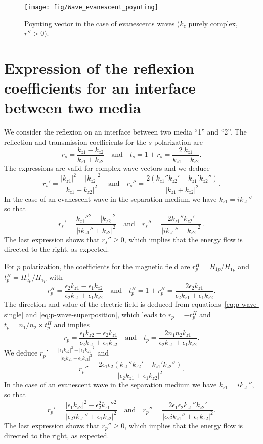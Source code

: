 \begin{figure}[!h]
\texttt{[image: fig/Wave\_evanescent\_poynting]}
\caption{\label{fig:Wave_evanescent_poynting}Poynting vector in the case of evanescents waves ($k_z$ purely complex, $r''>0$).}
\end{figure}

\section{Expression of the reflexion coefficients for an interface between two media}

We consider the reflexion on an interface between two media ``1'' and ``2''.
The reflection and transmission coefficients for the $s$ polarization are\cite{Wikipedia_Fresnel}
$$
r_s = \frac{k_{z1}-k_{z2}}{k_{z1}+k_{z2}} 
\quad\textrm{and}\quad
t_s = 1 + r_s = \frac{2\ k_{z1}}{k_{z1}+k_{z2}}.
$$
The expressions are valid for complex wave vectors and we deduce
$$
r_s' = \frac{|k_{z1}|^2 - |k_{z2}|^2}{|k_{z1} + k_{z2}|^2}
\quad\textrm{and}\quad
r_s'' = \frac{2 (k_{z1}'' k_{z2}' - k_{z1}' k_{z2}'')}{|k_{z1} + k_{z2}|^2}.
$$
In the case of an evanescent wave in the separation medium we have $k_{z1} = i k_{z1}''$ so that
$$
r_s' = \frac{k_{z1}''^2 - |k_{z2}|^2}{|ik_{z1}'' + k_{z2}|^2}
\quad\textrm{and}\quad
r_s'' = \frac{2 k_{z1}'' k_{z2}'}{|ik_{z1}'' + k_{z2}|^2}
\ .
$$
The last expression shows that $r_s'' \ge 0$, which implies that the energy flow is directed to the right, as expected.

For $p$ polarization, the coefficients for the magnetic field are
$r^H_p = H^-_{1p} / H^+_{1p}$ and $t^H_p = H^+_{2p} / H^+_{1p}$ with
$$
r^H_p=\frac{\epsilon_2k_{z1}-\epsilon_1k_{z2}}{\epsilon_2k_{z1}+\epsilon_1k_{z2}}
\quad\textrm{and}\quad
t^H_p = 1+r^H_p = \frac{2\epsilon_2 k_{z1}}{\epsilon_2k_{z1}+\epsilon_1k_{z2}}
.
$$
The direction and value of the electric field is deduced from equations~\ref{eq:p-wave-single} and \ref{eq:p-wave-superposition}, which leads to $r_p=-r^H_p$ and $t_p = n_1/n_2 \times t^H_p$ and implies \cite{Wikipedia_Fresnel}
$$
r_p=
\frac{\epsilon_1k_{z2} - \epsilon_2k_{z1}}{\epsilon_2k_{z1}+\epsilon_1k_{z2}}
\quad\textrm{and}\quad 
t_p = 
\frac{2 n_1 n_2 k_{z1}}{\epsilon_2k_{z1}+\epsilon_1k_{z2}}.
$$
We deduce
$ \displaystyle
r_p' = \frac{|\epsilon_1 k_{z2}|^2 - |\epsilon_2 k_{z1}|^2}{|\epsilon_2 k_{z1} + \epsilon_1 k_{z2}|^2}$ 
and
$$
r_p'' = \frac{2 \epsilon_1\epsilon_2(k_{z1}'' k_{z2}' - k_{z1}' k_{z2}'')}{|\epsilon_2 k_{z1} + \epsilon_1 k_{z2}|^2}.
$$
In the case of an evanescent wave in the separation medium we have $k_{z1} = i k_{z1}''$, so that
$$
r_p' = \frac{|\epsilon_1 k_{z2}|^2 - \epsilon_2^2 k_{z1}''^2}{|\epsilon_2 i k_{z1}'' + \epsilon_1 k_{z2}|^2}
\quad\textrm{and}\quad
r_p'' =  \frac{2 \epsilon_1\epsilon_2 k_{z1}'' k_{z2}'}{|\epsilon_2 i k_{z1}'' + \epsilon_1 k_{z2}|^2}
.
$$
The last expression shows that $r_p''\ge 0$, which implies that the energy flow is directed to the right, as expected.

